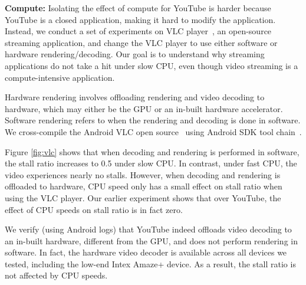 \noindent \textbf{Compute:} Isolating the effect of compute for YouTube is harder because YouTube is a closed application, making it hard to modify the application. Instead, we conduct a set of experiments on VLC player~\cite{andriodvlc}, an open-source streaming application, and change the VLC player to use either software or hardware rendering/decoding. Our goal is to understand why streaming applications do not take a hit under slow CPU, even though video streaming is a compute-intensive application.  

Hardware rendering involves offloading rendering and video decoding to hardware, which may either be the GPU or an in-built hardware accelerator. Software rendering refers to when the rendering and decoding is done in software.
We cross-compile the Android VLC open source~\cite{andriodvlc} using Android SDK tool chain~\cite{andriodsdk}. 


Figure \ref{fig:vlc} shows that when decoding and rendering is performed in software, the stall ratio increases to 0.5 under slow CPU. In contrast, under fast CPU, the video experiences nearly no stalls. However, when decoding and rendering is offloaded to hardware, CPU speed only has a small effect on stall ratio when using the VLC player. Our earlier experiment shows that over YouTube, the effect of CPU speeds on stall ratio is in fact zero. 

We verify (using Android logs)  that YouTube indeed offloads video decoding to an in-built hardware, different from the GPU, and does not perform rendering in software. %
 In fact, the hardware video decoder is available across all devices we tested, including the low-end Intex Amaze+ device. As a result, the stall ratio is not affected by CPU speeds.

